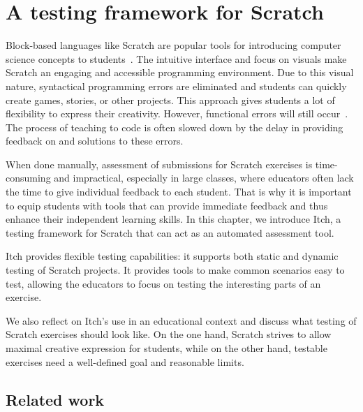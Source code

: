 \documentclass[../main]{subfiles}
\begin{document}
\chapter{A testing framework for Scratch}\label{ch:itch}


Block-based languages like Scratch are popular tools for introducing computer science concepts to students~\autocite{bauLearnableProgrammingBlocks2017}.
The intuitive interface and focus on visuals make Scratch an engaging and accessible programming environment.
Due to this visual nature, syntactical programming errors are eliminated and students can quickly create games, stories, or other projects.
This approach gives students a lot of flexibility to express their creativity.
However, functional errors will still occur~\autocite{zellerWhyProgramsFail2009a}.
The process of teaching to code is often slowed down by the delay in providing feedback on and solutions to these errors.

When done manually, assessment of submissions for Scratch exercises is time-consuming and impractical, especially in large classes, where educators often lack the time to give individual feedback to each student.
That is why it is important to equip students with tools that can provide immediate feedback and thus enhance their independent learning skills.
In this chapter, we introduce Itch, a testing framework for Scratch that can act as an automated assessment tool.

Itch provides flexible testing capabilities: it supports both static and dynamic testing of Scratch projects.
It provides tools to make common scenarios easy to test, allowing the educators to focus on testing the interesting parts of an exercise.

We also reflect on Itch's use in an educational context and discuss what testing of Scratch exercises should look like.
On the one hand, Scratch strives to allow maximal creative expression for students, while on the other hand, testable exercises need a well-defined goal and reasonable limits.

\section{Related work}\label{sec:related-work}
\end{document}
